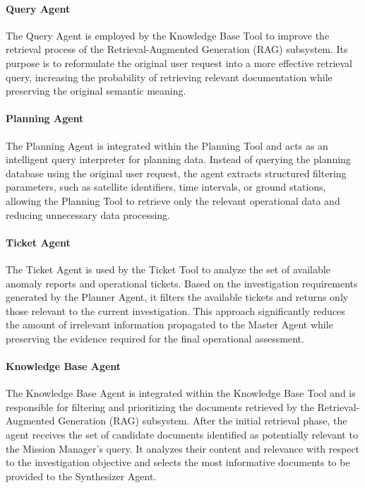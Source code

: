 \paragraph{Query Agent}

The Query Agent is employed by the Knowledge Base Tool to improve the retrieval process of the Retrieval-Augmented Generation (RAG) subsystem. Its purpose is to reformulate the original user request into a more effective retrieval query, increasing the probability of retrieving relevant documentation while preserving the original semantic meaning.

\paragraph{Planning Agent}

The Planning Agent is integrated within the Planning Tool and acts as an intelligent query interpreter for planning data. Instead of querying the planning database using the original user request, the agent extracts structured filtering parameters, such as satellite identifiers, time intervals, or ground stations, allowing the Planning Tool to retrieve only the relevant operational data and reducing unnecessary data processing.

\paragraph{Ticket Agent}

The Ticket Agent is used by the Ticket Tool to analyze the set of available anomaly reports and operational tickets. Based on the investigation requirements generated by the Planner Agent, it filters the available tickets and returns only those relevant to the current investigation. This approach significantly reduces the amount of irrelevant information propagated to the Master Agent while preserving the evidence required for the final operational assessment. 

\paragraph{Knowledge Base Agent}

The Knowledge Base Agent is integrated within the Knowledge Base Tool and is responsible for filtering and prioritizing the documents retrieved by the Retrieval-Augmented Generation (RAG) subsystem. After the initial retrieval phase, the agent receives the set of candidate documents identified as potentially relevant to the Mission Manager's query. It analyzes their content and relevance with respect to the investigation objective and selects the most informative documents to be provided to the Synthesizer Agent.

